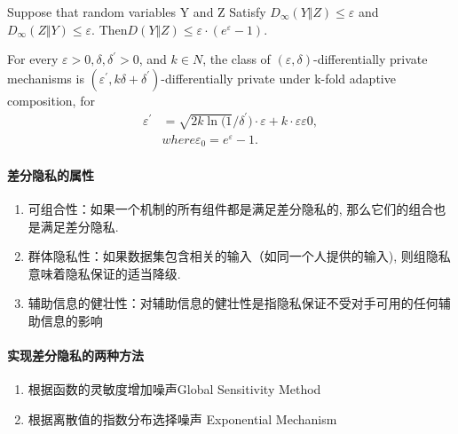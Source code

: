 \begin{theorem}
    Suppose that random variables Y and Z Satisfy $D_{\infty}(Y\Vert Z)\leq\varepsilon$ and $D_{\infty}(Z\Vert Y)\leq\varepsilon$. Then$ D(Y \Vert Z)\leq\varepsilon\cdot(e^{\varepsilon}-1)$.
\end{theorem}


\begin{theorem}
    For every $\varepsilon > 0, \delta, \delta^{\prime} > 0$, and $k \in N$, the class of $(\varepsilon, \delta)$-differentially private mechanisms is $(\varepsilon^{\prime}, k\delta+\delta^{\prime})$-differentially private under k-fold adaptive composition, for
\begin{equation}
\begin{aligned}
     \varepsilon^{\prime} &=\sqrt{2k\ln(1}/\delta^{\prime})\cdot\varepsilon+k\cdot\varepsilon\varepsilon 0,
      \\ & { where} \varepsilon_{0}=e^{\varepsilon}-1.
\end{aligned}
\end{equation}

\end{theorem}

  
\paragraph{差分隐私的属性}
\begin{enumerate}

\item  可组合性：如果一个机制的所有组件都是满足差分隐私的, 那么它们的组合也是满足差分隐私. 
\item 群体隐私性：如果数据集包含相关的输入（如同一个人提供的输入), 则组隐私意味着隐私保证的适当降级. 
\item  辅助信息的健壮性：对辅助信息的健壮性是指隐私保证不受对手可用的任何辅助信息的影响
\end{enumerate}



\paragraph{实现差分隐私的两种方法}
\begin{enumerate}
    \item 根据函数的灵敏度增加噪声Global Sensitivity Method
    \item 根据离散值的指数分布选择噪声 Exponential Mechanism
\end{enumerate}



